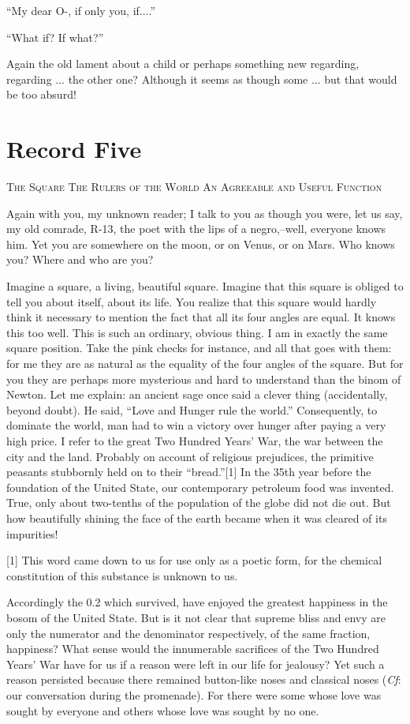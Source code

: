 \documentclass[11pt,openany]{book}
\newcommand{\bookchapterplain}[1]{%
  \clearpage\phantomsection
  \chapter*{#1}%
  \addcontentsline{toc}{chapter}{#1}%
  \markboth{#1}{#1}\thispagestyle{plain}}
\begin{document}
``My dear O-, if only you, if....''

``What if? If what?''

Again the old lament about a child or perhaps something new regarding, regarding ... the other one? Although it seems as though some ... but that would be too absurd!

\bookchapterplain{Record Five}

\begin{center}\textsc{The Square The Rulers of the World An Agreeable and Useful Function}\end{center}

Again with you, my unknown reader; I talk to you as though you were, let us say, my old comrade, R-13, the poet with the lips of a negro,--well, everyone knows him. Yet you are somewhere on the moon, or on Venus, or on Mars. Who knows you? Where and who are you?

Imagine a square, a living, beautiful square. Imagine that this square is obliged to tell you about itself, about its life. You realize that this square would hardly think it necessary to mention the fact that all its four angles are equal. It knows this too well. This is such an ordinary, obvious thing. I am in exactly the same square position. Take the pink checks for instance, and all that goes with them: for me they are as natural as the equality of the four angles of the square. But for you they are perhaps more mysterious and hard to understand than the binom of Newton. Let me explain: an ancient sage once said a clever thing (accidentally, beyond doubt). He said, ``Love and Hunger rule the world.'' Consequently, to dominate the world, man had to win a victory over hunger after paying a very high price. I refer to the great Two Hundred Years' War, the war between the city and the land. Probably on account of religious prejudices, the primitive peasants stubbornly held on to their ``bread.''[1] In the 35th year before the foundation of the United State, our contemporary petroleum food was invented. True, only about two-tenths of the population of the globe did not die out. But how beautifully shining the face of the earth became when it was cleared of its impurities!

[1] This word came down to us for use only as a poetic form, for the chemical constitution of this substance is unknown to us.

Accordingly the 0.2 which survived, have enjoyed the greatest happiness in the bosom of the United State. But is it not clear that supreme bliss and envy are only the numerator and the denominator respectively, of the same fraction, happiness? What sense would the innumerable sacrifices of the Two Hundred Years' War have for us if a reason were left in our life for jealousy? Yet such a reason persisted because there remained button-like noses and classical noses (\emph{Cf}: our conversation during the promenade). For there were some whose love was sought by everyone and others whose love was sought by no one.
\end{document}
